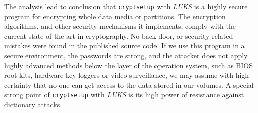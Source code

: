 The analysis lead to conclusion that {\tt cryptsetup} with {\it LUKS} is a highly secure program for encrypting whole data media or partitions.
The encryption algorithms, and other security mechanisms it implements, comply with the current state of the art in cryptography.
No back door, or security-related mistakes were found in the published source code.
If we use this program in a secure environment, the passwords are strong, and the attacker does not apply highly advanced methods below the layer of the operation system, such as BIOS root-kits, hardware key-loggers or video surveillance, we may assume with high certainty that no one can get access to the data stored in our volumes.
A special strong point of {\tt cryptsetup} with {\it LUKS} is its high power of resistance against dictionary attacks\cite{team2012security}.
